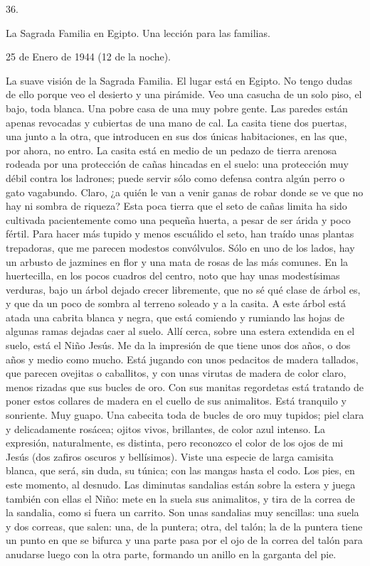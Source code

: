 \documentclass[12pt]{book} %
\begin{document}
 
36. 
 
 La Sagrada Familia en Egipto. Una lección para las familias. 
 
 
25 de Enero de 1944 (12 de la noche). 
 
La suave visión de la Sagrada Familia. El lugar está en Egipto. No tengo dudas de ello porque veo el desierto y una 
pirámide. 
Veo una casucha de un solo piso, el bajo, toda blanca. Una pobre casa de una muy pobre gente. Las paredes están apenas revocadas y cubiertas de una mano de cal. La casita tiene dos puertas, una junto a la otra, que introducen en sus dos únicas habitaciones, en las que, por ahora, no entro. La casita está en medio de un pedazo de tierra arenosa rodeada por una protección de cañas hincadas en el suelo: una protección muy débil contra los ladrones; puede servir sólo como defensa contra algún perro o gato vagabundo. Claro, ¿a quién le van a venir ganas de robar donde se ve que no hay ni sombra de riqueza? 
Esta poca tierra que el seto de cañas limita ha sido cultivada pacientemente como una pequeña huerta, a pesar de ser árida y poco fértil. Para hacer más tupido y menos escuálido el seto, han traído unas plantas trepadoras, que me parecen modestos convólvulos. Sólo en uno de los lados, hay un arbusto de jazmines en flor y una mata de rosas de las más comunes. En la huertecilla, en los pocos cuadros del centro, noto que hay unas modestísimas verduras, bajo un árbol dejado crecer libremente, que no sé qué clase de árbol es, y que da un poco de sombra al terreno soleado y a la casita. A este árbol está atada una cabrita blanca y negra, que está comiendo y rumiando las hojas de algunas ramas dejadas caer al suelo. 
Allí cerca, sobre una estera extendida en el suelo, está el Niño Jesús. Me da la impresión de que tiene unos dos años, o dos años y medio como mucho. Está jugando con unos pedacitos de madera tallados, que parecen ovejitas o caballitos, y con unas virutas de madera de color claro, menos rizadas que sus bucles de oro. Con sus manitas regordetas está tratando de poner estos collares de madera en el cuello de sus animalitos. 
Está tranquilo y sonriente. Muy guapo. Una cabecita toda de bucles de oro muy tupidos; piel clara y delicadamente 
rosácea; ojitos vivos, brillantes, de color azul intenso. La expresión, naturalmente, es distinta, pero reconozco el color de los ojos de mi Jesús (dos zafiros oscuros y bellísimos). 
Viste una especie de larga camisita blanca, que será, sin duda, su túnica; con las mangas hasta el codo. Los pies, en este 
momento, al desnudo. Las diminutas sandalias están sobre la estera y juega también con ellas el Niño: mete en la suela sus animalitos, y tira de la correa de la sandalia, como si fuera un carrito. Son unas sandalias muy sencillas: una suela y dos correas, que salen: una, de la puntera; otra, del talón; la de la puntera tiene un punto en que se bifurca y una parte pasa por el ojo de la correa del talón para anudarse luego con la otra parte, formando un anillo en la garganta del pie.   
\end{document}
